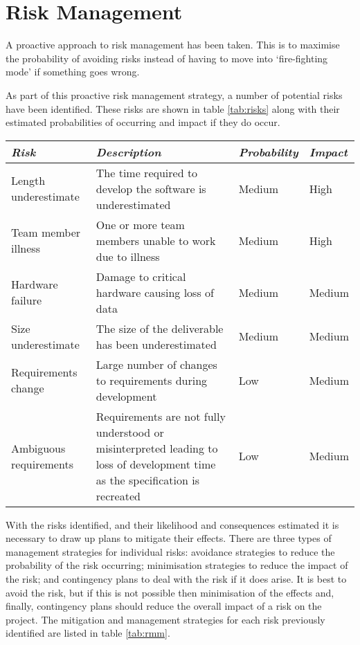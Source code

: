 \section{Risk Management}
\label{section:risk}

A proactive approach to risk management has been taken. This is to maximise the probability
of avoiding risks instead of having to move into `fire-fighting mode' if something goes
wrong.

As part of this proactive risk management strategy, a number of potential risks
have been identified. These risks are shown in table \ref{tab:risks} along with their
estimated probabilities of occurring and impact if they do occur.

\begin{table*}
	\small
	\begin{tabular}{l p{} l l}
		\toprule
		\emph{Risk} & \emph{Description} & \emph{Probability} & \emph{Impact} \\
		\midrule
		Length underestimate & The time required to develop the software is underestimated & Medium & High \\
		Team member illness & One or more team members unable to work due to illness & Medium & High \\
		Hardware failure & Damage to critical hardware causing loss of data & Medium & Medium \\
		Size underestimate & The size of the deliverable has been underestimated & Medium & Medium \\
		Requirements change & Large number of changes to requirements during development & Low & Medium \\
		Ambiguous requirements & Requirements are not fully understood or misinterpreted leading to
			loss of development time as the specification is recreated & Low & Medium \\
		\bottomrule
	\end{tabular}
	\vspace{1.5em}
	\caption{Risk identification and analysis}
	\label{tab:risks}
\end{table*}

With the risks identified, and their likelihood and consequences estimated it is necessary
to draw up plans to mitigate their effects. There are three types of management strategies 
for individual risks: avoidance strategies to reduce the probability of the risk occurring;
minimisation strategies to reduce the impact of the risk; and contingency plans to deal with
the risk if it does arise. It is best to avoid the risk,
but if this is not possible then minimisation of the effects and, finally, contingency plans
should reduce the overall impact of a risk on the project. The mitigation and management
strategies for each risk previously identified are listed in table \ref{tab:rmm}.

